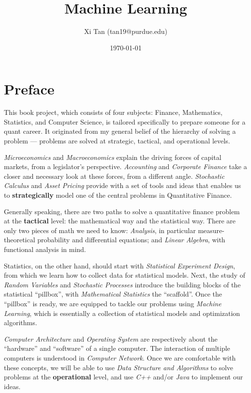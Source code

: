 \documentclass{book}
\title{Machine Learning}
\author{Xi Tan (tan19@purdue.edu)}
\date{\today}
\begin{document}
\maketitle

\tableofcontents
\newpage

\section*{Preface}
This book project, which consists of four subjects: Finance, Mathematics, Statistics, and Computer Science, is tailored specifically to prepare someone for a quant career. It originated from my general belief of the hierarchy of solving a problem --- problems are solved at strategic, tactical, and operational levels.

{\em{Microeconomics}} and {\em{Macroeconomics}} explain the driving forces of capital markets, from a legislator's perspective. {\em{Accounting}} and {\em{Corporate Finance}} take a closer and necessary look at these forces, from a different angle. {\em{Stochastic Calculus}} and {\em{Asset Pricing}} provide with a set of tools and ideas that enables us to {\bf{strategically}} model one of the central problems in Quantitative Finance.

Generally speaking, there are two paths to solve a quantitative finance problem at the {\bf{tactical}} level: the mathematical way and the statistical way. There are only two pieces of math we need to know: {\em{Analysis}}, in particular measure-theoretical probability and differential equations; and {\em{Linear Algebra}}, with functional analysis in mind.

Statistics, on the other hand, should start with {\em{Statistical Experiment Design}}, from which we learn how to collect data for statistical models. Next, the study of {\em{Random Variables}} and {\em{Stochastic Processes}} introduce the building blocks of the statistical ``pillbox'', with {\em{Mathematical Statistics}} the ``scaffold''. Once the ``pillbox'' is ready, we are equipped to tackle our problems using {\em{Machine Learning}}, which is essentially a collection of statistical models and optimization algorithms.

{\em{Computer Architecture}} and {\em{Operating System}} are respectively about the ``hardware'' and ``software'' of a single computer. The interaction of multiple computers is understood in {\em{Computer Network}}. Once we are comfortable with these concepts, we will be able to use {\em{Data Structure and Algorithms}} to solve problems at the {\bf{operational}} level, and use {\em{C++}} and/or {\em{Java}} to implement our ideas.
\end{document}
